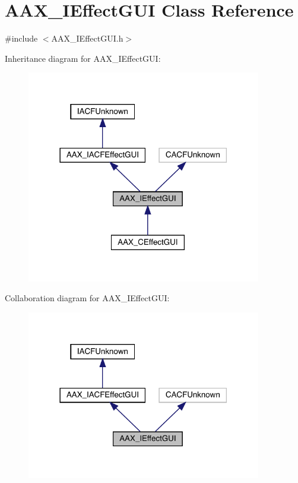 \hypertarget{a01821}{}\section{A\+A\+X\+\_\+\+I\+Effect\+G\+UI Class Reference}
\label{a01821}


{\ttfamily \#include $<$A\+A\+X\+\_\+\+I\+Effect\+G\+U\+I.\+h$>$}



Inheritance diagram for A\+A\+X\+\_\+\+I\+Effect\+G\+UI\+:
\nopagebreak
\begin{figure}[H]
\begin{center}
\leavevmode
\includegraphics[width=290pt]{a01820}
\end{center}
\end{figure}


Collaboration diagram for A\+A\+X\+\_\+\+I\+Effect\+G\+UI\+:
\nopagebreak
\begin{figure}[H]
\begin{center}
\leavevmode
\includegraphics[width=290pt]{a01819}
\end{center}
\end{figure}


